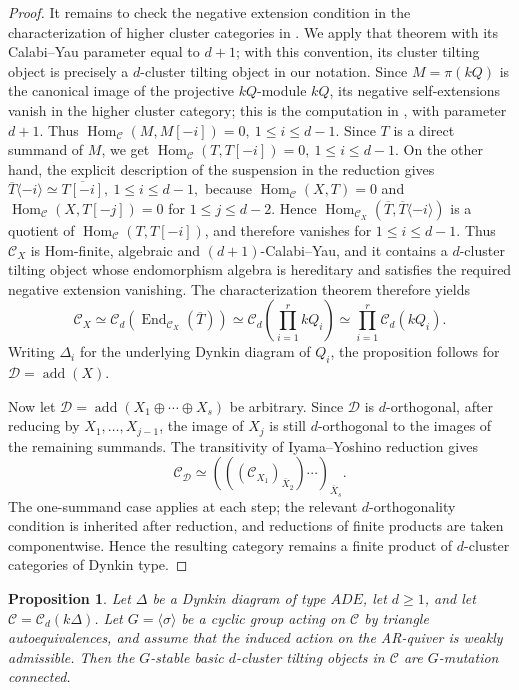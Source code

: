 \documentclass[12pt]{article}
\theoremstyle{plain}
\newtheorem{Prop}[Def]{Proposition}
\theoremstyle{definition}
\DeclareMathOperator{\add}{add}
\DeclareMathOperator{\End}{End}
\DeclareMathOperator{\Hom}{Hom}
\renewcommand{\geq}{\geqslant}
\begin{document}
\begin{proof}
It remains to check the negative extension condition in the characterization
of higher cluster categories in \cite[Theorem 4.2]{Keller2008ab}.  We apply
that theorem with its Calabi--Yau parameter equal to \(d+1\); with this
convention, its cluster tilting object is precisely a \(d\)-cluster tilting
object in our notation.  Since \(M=\pi(kQ)\) is the canonical image of the
projective \(kQ\)-module \(kQ\), its negative self-extensions vanish in the
higher cluster category; this is the computation in
\cite[Section 4.1]{Keller2008ab}, with parameter \(d+1\).  Thus
\(\Hom_{\mathcal C}(M,M[-i])=0,\ 1\le i\le d-1.\)
Since \(T\) is a direct summand of \(M\), we get
\(\Hom_{\mathcal C}(T,T[-i])=0,\ 1\le i\le d-1.\)
On the other hand, the explicit description of the suspension in the reduction
gives
\(\overline T\langle -i\rangle\simeq \overline{T[-i]},\ 1\le i\le d-1,\)
because \(\Hom_{\mathcal C}(X,T)=0\) and
\(\Hom_{\mathcal C}(X,T[-j])=0\) for \(1\le j\le d-2\).  Hence
\(\Hom_{\mathcal C_X}(\overline T,\overline T\langle -i\rangle)\)
is a quotient of \(\Hom_{\mathcal C}(T,T[-i])\), and therefore vanishes for
\(1\le i\le d-1\).  Thus \(\mathcal C_X\) is Hom-finite, algebraic and
\((d+1)\)-Calabi--Yau, and it contains a \(d\)-cluster tilting object whose
endomorphism algebra is hereditary and satisfies the required negative
extension vanishing.  The characterization theorem therefore yields
\[
\mathcal C_X
\simeq
\mathcal C_d\!\left(\End_{\mathcal C_X}(\overline T)\right)
\simeq
\mathcal C_d\!\left(\prod_{i=1}^r kQ_i\right)
\simeq
\prod_{i=1}^r \mathcal C_d(kQ_i).
\]
Writing \(\Delta_i\) for the underlying Dynkin diagram of \(Q_i\), the proposition
follows for \(\mathcal D=\add(X)\).

Now let
\(\mathcal D=\add(X_1\oplus\cdots\oplus X_s)\)
be arbitrary.  Since \(\mathcal D\) is \(d\)-orthogonal, after reducing by
\(X_1,\ldots,X_{j-1}\), the image of \(X_j\) is still \(d\)-orthogonal to the
images of the remaining summands.  The transitivity of Iyama--Yoshino
reduction gives
\[
\mathcal C_{\mathcal D}
\simeq
(((\mathcal C_{X_1})_{\overline X_2})\cdots)_{\overline X_s}.
\]
The one-summand case applies at each step; the relevant \(d\)-orthogonality
condition is inherited after reduction, and reductions of finite products are
taken componentwise.  Hence the resulting category remains a finite product of
\(d\)-cluster categories of Dynkin type.
\end{proof}
 

\begin{Prop}\label{prop-dynkin-G-mutation-connected}
Let \(\Delta\) be a Dynkin diagram of type \(ADE\), let \(d\geq1\), and let
\(\mathcal C=\mathcal C_d(k\Delta)\).  Let \(G=\langle\sigma\rangle\) be a
cyclic group acting on \(\mathcal C\) by triangle autoequivalences, and assume
that the induced action on the AR-quiver is weakly admissible.  Then the
\(G\)-stable basic \(d\)-cluster tilting objects in \(\mathcal C\) are
\(G\)-mutation connected.
\end{Prop}
\end{document}

